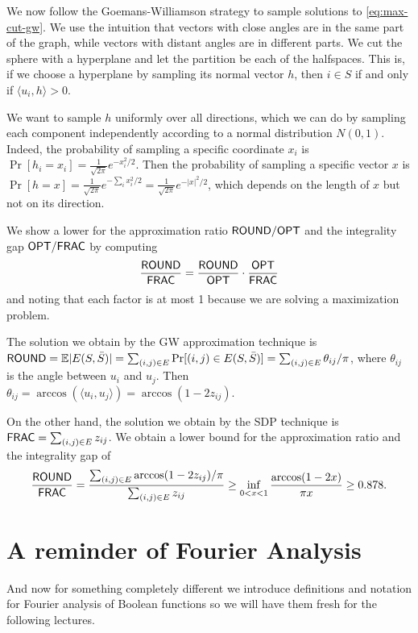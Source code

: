 \documentclass[a4paper,twoside,justified]{tufte-handout}
\begin{document}
We now follow the Goemans-Williamson strategy to sample solutions to \eqref{eq:max-cut-gw}. We use the intuition that vectors with close angles are in the same part of the graph, while vectors with distant angles are in different parts. We cut the sphere with a hyperplane and let the partition be each of the halfspaces. This is, if we choose a hyperplane by sampling its normal vector $h$, then $i \in S$ if and only if $\langle u_i,h \rangle > 0$.

We want to sample $h$ uniformly over all directions, which we can do by sampling each component independently according to a normal distribution $N(0,1)$. Indeed, the probability of sampling a specific coordinate $x_i$ is $\Pr[h_i=x_i] = \frac{1}{\sqrt {2\pi}}e^{-x_i^2/2}$. Then the probability of sampling a specific vector $x$ is $\Pr[h=x] = \frac{1}{\sqrt {2\pi}}e^{-\sum_i x_i^2/2} = \frac{1}{\sqrt {2\pi}}e^{-|x|^2/2}$, which depends on the length of $x$ but not on its direction.

We show a lower for the approximation ratio $\mathsf{ROUND} / \mathsf{OPT}$ and the integrality gap $\mathsf{OPT} / \mathsf{FRAC}$ by computing
\begin{equation}
\frac{\mathsf{ROUND}}{\mathsf{FRAC}}=\frac{\mathsf{ROUND}}{\mathsf{OPT}}\cdot\frac{\mathsf{OPT}}{\mathsf{FRAC}}
\end{equation}
and noting that each factor is at most 1 because we are solving a maximization problem.

The solution we obtain by the GW approximation technique is $\mathsf{ROUND} = \mathbb{E}|E(S,\bar S)|=\sum_{(i,j)\in E}\Pr[(i,j)\in E(S,\bar S)]=\sum_{(i,j)\in E} \theta_{ij}/\pi$, where $\theta_{ij}$ is the angle between $u_i$ and $u_j$. Then $\theta_{ij}=\arccos(\langle u_i,u_j \rangle) = \arccos(1-2z_{ij})$.

On the other hand, the solution we obtain by the SDP technique is $\mathsf{FRAC} = \sum_{(i,j)\in E} z_{ij}$. We obtain a lower bound for the approximation ratio and the integrality gap of \begin{equation}\frac{\mathsf{ROUND}}{\mathsf{FRAC}} = \frac{\sum_{(i,j)\in E} \arccos(1-2z_{ij})/\pi}{\sum_{(i,j)\in E} z_{ij}} \geq \inf_{0 < x < 1} \frac{\arccos(1-2x)}{\pi x} \geq 0.878.\end{equation}


\section{A reminder of Fourier Analysis}

And now for something completely different we introduce definitions and notation for Fourier analysis of Boolean functions so we will have them fresh for the following lectures.
\end{document}
